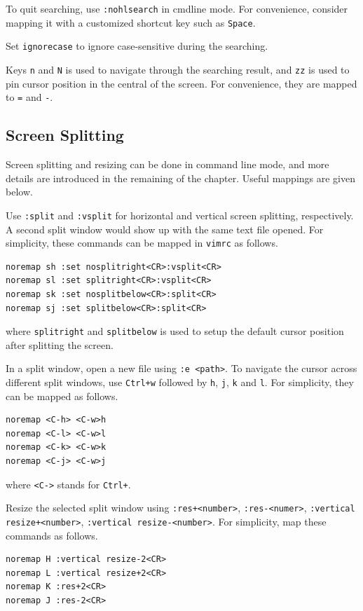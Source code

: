 To quit searching, use \verb|:nohlsearch| in cmdline mode. For convenience, consider mapping it with a customized shortcut key such as \verb|Space|. 

Set \verb|ignorecase| to ignore case-sensitive during the searching.

Keys \verb|n| and \verb|N| is used to navigate through the searching result, and \verb|zz| is used to pin cursor position in the central of the screen. For convenience, they are mapped to \verb|=| and \verb|-|.

\subsection{Screen Splitting}

Screen splitting and resizing can be done in command line mode, and more details are introduced in the remaining of the chapter. Useful mappings are given below.

Use \verb|:split| and \verb|:vsplit| for horizontal and vertical screen splitting, respectively. A second split window would show up with the same text file opened. For simplicity, these commands can be mapped in \verb|vimrc| as follows.
\begin{lstlisting}
noremap sh :set nosplitright<CR>:vsplit<CR>
noremap sl :set splitright<CR>:vsplit<CR>
noremap sk :set nosplitbelow<CR>:split<CR>
noremap sj :set splitbelow<CR>:split<CR>
\end{lstlisting}
where \verb|splitright| and \verb|splitbelow| is used to setup the default cursor position after splitting the screen.

In a split window, open a new file using \verb|:e <path>|. To navigate the cursor across different split windows, use \verb|Ctrl+w| followed by \verb|h|, \verb|j|, \verb|k| and \verb|l|. For simplicity, they can be mapped as follows.
\begin{lstlisting}
noremap <C-h> <C-w>h
noremap <C-l> <C-w>l
noremap <C-k> <C-w>k
noremap <C-j> <C-w>j
\end{lstlisting}
where \verb|<C->| stands for \verb|Ctrl+|.

Resize the selected split window using \verb|:res+<number>|, \verb|:res-<numer>|, \verb|:vertical resize+<number>|, \verb|:vertical resize-<number>|. For simplicity, map these commands as follows.
\begin{lstlisting}
noremap H :vertical resize-2<CR>
noremap L :vertical resize+2<CR>
noremap K :res+2<CR>
noremap J :res-2<CR>
\end{lstlisting}

